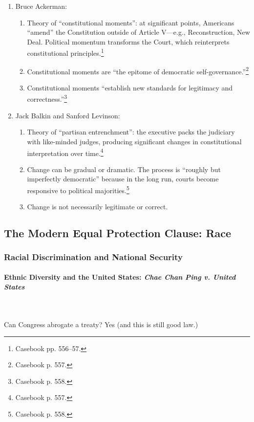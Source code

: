 \begin{enumerate}
    \item Bruce Ackerman:
    \begin{enumerate}
        \item Theory of ``constitutional moments'': at significant points, 
        Americans ``amend'' the Constitution outside of Article V---e.g., 
        Reconstruction, New Deal. Political momentum transforms the Court, 
        which reinterprets constitutional principles.\footnote{Casebook pp. 
        556--57.}
        \item Constitutional moments are ``the epitome of democratic 
        self-governance.''\footnote{Casebook p. 557.}
        \item Constitutional moments ``establish new standards for legitimacy 
        and correctness.''\footnote{Casebook p. 558.}
    \end{enumerate}
    \item Jack Balkin and Sanford Levinson:
    \begin{enumerate}
        \item Theory of ``partisan entrenchment'': the executive packs the 
        judiciary with like-minded judges, producing significant changes in 
        constitutional interpretation over time.\footnote{Casebook p. 557.}
        \item Change can be gradual or dramatic. The process is ``roughly but 
        imperfectly democratic'' because in the long run, courts become 
        responsive to political majorities.\footnote{Casebook p. 558.}
        \item Change is not necessarily legitimate or correct.
    \end{enumerate}
\end{enumerate}

\subsection{The Modern Equal Protection Clause: Race}

\subsubsection{Racial Discrimination and National Security}

\paragraph{Ethnic Diversity and the United States: \emph{Chae Chan Ping v. 
United States}}
~\\\\
Can Congress abrogate a treaty? Yes (and this is still good law.)

